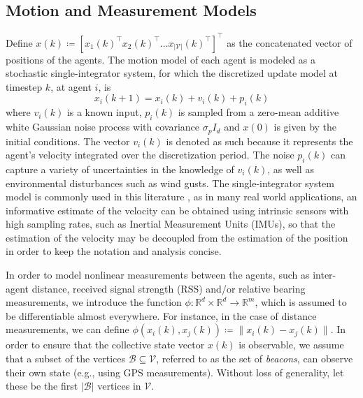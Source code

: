 \documentclass[twocolumn]{article}
\theoremstyle{plain}
\theoremstyle{definition}
\theoremstyle{definition}
\theoremstyle{remark}
\begin{document}
\subsection{Motion and Measurement Models}
\noindent
Define $x(k) \coloneqq [x_1(k)^\top x_2(k)^\top \dots x_{|\mathcal V|}(k)^\top]^\top$ as the concatenated vector of positions of the agents. The motion model of each agent is modeled as a stochastic single-integrator system, for which the discretized update model at timestep $k$, at agent $i$, is
\begin{equation}
    x_i(k+1) = x_i (k) + v_i(k) + p_i(k)
    \label{eq:system}
\end{equation}
where $v_i(k)$ is a known input, $p_i(k)$ is sampled from a zero-mean additive white Gaussian noise process with covariance $\sigma _p I_d$ and $x(0)$ is given by the initial conditions. The vector $v_i(k)$ is denoted as such because it represents the agent's velocity integrated over the discretization period. The noise $p_i(k)$ can capture a variety of uncertainties in the knowledge of $v_i(k)$, as well as environmental disturbances such as wind gusts. 
The single-integrator system model is commonly used in this literature \cite{observability2015, zhao2019bearing}, as in many real world applications, an informative estimate of the velocity can be obtained using intrinsic sensors with high sampling rates, such as Inertial Measurement Units (IMUs), so that the estimation of the velocity may be decoupled from the estimation of the position in order to keep the notation and analysis concise.

In order to model nonlinear measurements between the agents, such as inter-agent distance, received signal strength (RSS) and/or relative bearing measurements, we introduce the function $\phi : \mathbb R^d \times \mathbb R^d \rightarrow \mathbb R^m$, which is assumed to be differentiable almost everywhere. For instance, in the case of distance measurements, we can define $\phi(x_i(k), x_j(k)) \coloneqq \|x_i(k) - x_j(k)\|$. 
In order to ensure that the collective state vector $x(k)$ is observable, we assume that a subset of the vertices $\mathcal B \subseteq \mathcal V$, referred to as the set of \textit{beacons}, can observe their own state (e.g., using GPS measurements). Without loss of generality, let these be the first $|\mathcal B|$ vertices in $\mathcal V$.
\end{document}
